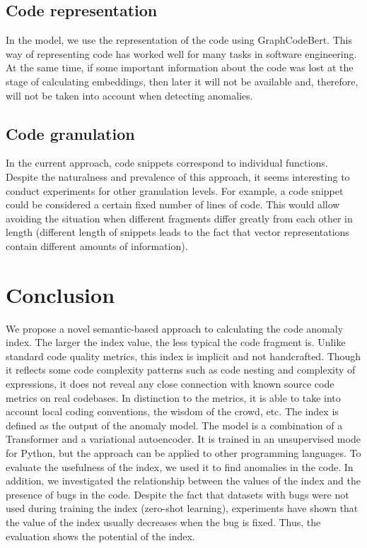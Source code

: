 \documentclass[10pt,conference]{IEEEtran}
\begin{document}
\subsection{Code representation}

In the model, we use the representation of the code using GraphCodeBert.
This way of representing code has worked well for many tasks in software engineering.
At the same time, if some important information about the code was lost at the stage of calculating embeddings,
 then later it will not be available and, therefore, will not be taken into account when detecting anomalies.

\subsection{Code granulation}

In the current approach, code snippets correspond to individual functions.
Despite the naturalness and prevalence of this approach, it seems interesting to conduct experiments for other granulation levels.
For example, a code snippet could be considered a certain fixed number of lines of code.
This would allow avoiding the situation when different fragments differ greatly from each other in length
 (different length of snippets leads to the fact that vector representations contain different amounts of information).


\section{Conclusion}\label{conclusion}
We propose a novel semantic-based  approach to calculating the code anomaly index.
The larger the index value, the less typical the code fragment is.
Unlike standard code quality metrics, this index is implicit and not handcrafted.
Though it reflects some code complexity patterns such as code nesting and complexity of expressions,
it does not reveal any close connection with known source code metrics on real codebases.
In distinction to the metrics, it is able to take into account local coding conventions, the wisdom of the crowd, etc. 
The index is defined as the output of the anomaly model.
The model is a combination of a Transformer and a variational autoencoder.
It is trained in an unsupervised mode for Python, but the approach can be applied to other programming languages.
To evaluate the usefulness of the index, we used it to find anomalies in the code.
In addition, we investigated the relationship between the values of the index and the presence of bugs in the code.
Despite the fact that datasets with bugs were not used during training the index (zero-shot learning),
 experiments have shown that the value of the index usually decreases when the bug is fixed.
Thus, the evaluation shows the potential of the index.
\end{document}
